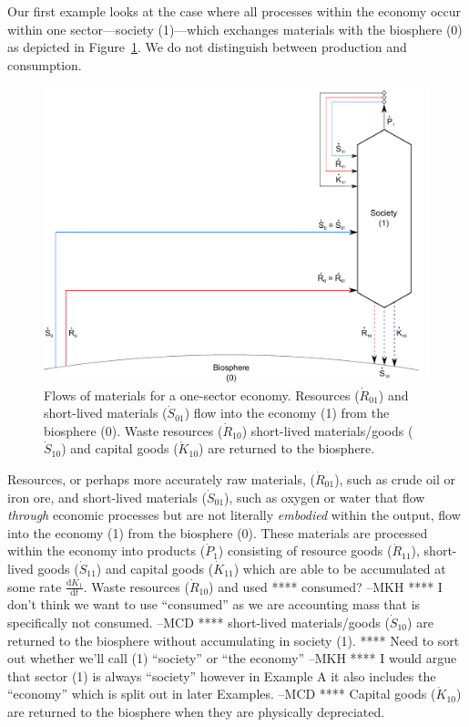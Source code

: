Our first example looks at the case where all processes within the economy occur within
one sector---society (1)---which exchanges materials with the biosphere (0) as depicted in
Figure~\ref{fig:A_materials}.  We do not distinguish between production and consumption.

\begin{figure}[!ht]
\centering{}
\includegraphics[width=0.8\linewidth]{Part_1/Chapter_Materials/images/1_sector_materials.pdf}
\caption[Flows of materials for a one-sector economy]{Flows of materials 
for a one-sector economy. 
Resources ($\dot{R}_{01}$) and short-lived materials 
($\dot{S}_{01}$) flow into the economy (1) 
from the biosphere (0). Waste resources 
($\dot{R}_{10}$) short-lived materials/goods 
($\dot{S}_{10}$) and capital goods 
($\dot{K}_{10}$) are returned to the biosphere.}
\label{fig:A_materials}
\end{figure}

Resources, or perhaps more accurately raw materials, 
($\dot{R}_{01}$), such as crude oil or iron ore, 
and short-lived materials ($\dot{S}_{01}$), 
such as oxygen or water that flow \emph{through} economic
processes but are not literally \emph{embodied} within the output, 
flow into the economy (1) from the biosphere (0). 
These materials are processed within the economy into products ($\dot{P}_{1}$) 
consisting of resource goods ($\dot{R}_{11}$), 
short-lived goods ($\dot{S}_{11}$) and capital 
goods ($\dot{K}_{11}$)
which are able to be accumulated at some rate 
$\frac{\mathrm{d}K_{1}}{\mathrm{d}t}$.
Waste resources ($\dot{R}_{10}$) and used **** consumed? --MKH **** 
I don't think we want to use ``consumed'' as we are accounting
mass that is specifically not consumed. --MCD ****
short-lived materials/goods ($\dot{S}_{10}$)
are returned to the biosphere without 
accumulating in society (1). **** Need to sort out whether we'll call (1)
``society'' or ``the economy'' --MKH **** 
I would argue that sector (1) is always ``society''
however in Example A it also includes the ``economy'' which is
split out in later Examples. --MCD ****
Capital goods ($\dot{K}_{10}$) 
are returned to the biosphere 
when they are physically depreciated.

